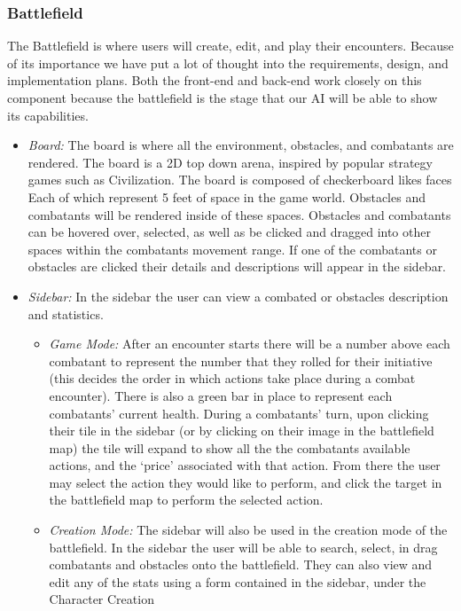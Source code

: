 \documentclass[letterpaper, 10 pt, conference]{ieeeconf}
\begin{document}
\subsubsection{Battlefield}
The Battlefield is where users will create, edit,
and play their encounters. Because of its importance we have put a lot of thought
into the requirements, design, and implementation plans. Both the front-end and
back-end work closely on this component because the battlefield is the stage
that our AI will be able to show its capabilities.
\begin{itemize}
	\item \textit{Board:} The board is where all the environment, obstacles, and combatants are rendered.
	The board is a 2D top down arena, inspired by popular strategy games
	such as Civilization. The board is composed of checkerboard likes faces Each of
	which represent 5 feet of space in the game world. Obstacles and combatants will
	be rendered inside of these spaces. Obstacles and combatants can be hovered over,
	selected, as well as be clicked and dragged into other spaces within the combatants
	movement range. If one of the combatants or obstacles are clicked their details
	and descriptions will appear in the sidebar. \\
	\item \textit{Sidebar:} In the sidebar the user can view a combated or obstacles description and statistics.
	\begin{itemize}
		 \item \textit{Game Mode:} After an encounter starts there will be a number above each combatant to represent the number that they rolled for their initiative (this decides the order in which actions take place during a combat encounter). There is also a green bar in place to represent each combatants' current health. During a combatants' turn, upon clicking their tile in the sidebar (or by clicking on their image in the battlefield map) the tile will expand to show all the the combatants available actions, and the `price' associated with that action. From there the user may select the action they would like to perform, and click the target in the battlefield map to perform the selected action. \\
		 \item \textit{Creation Mode:} The sidebar will also be used in the creation mode
		of the battlefield. In the sidebar the user will be able to search, select, in drag
		combatants and obstacles onto the battlefield. They can also view and edit any
		of the stats using a form contained in the sidebar, under the Character Creation

\end{itemize}
\end{itemize}
\end{document}
